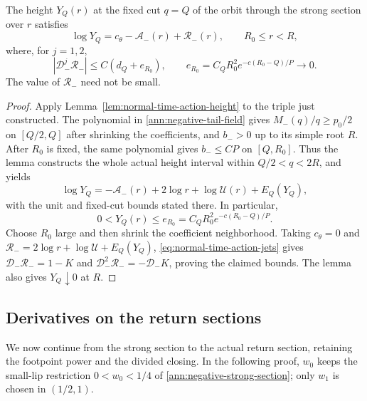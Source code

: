 \begin{lemma}\label{ann:lem-global-action-preparation}
The height \(Y_Q(r)\) at the fixed cut \(q=Q\) of the orbit through
the strong section over \(r\) satisfies
\begin{equation}\label{ann:negative-action-preparation}
 \log Y_Q=c_\theta-\mathcal A_-(r)+\mathcal R_-(r),
 \qquad R_0\le r<R,
\end{equation}
where, for \(j=1,2\),
\begin{equation}\label{ann:negative-action-remainder}
 |\mathcal D_-^j\mathcal R_-|\le C(d_Q+e_{R_0}),\qquad
 e_{R_0}=C_QR_0^2e^{-c(R_0-Q)/P}\longrightarrow0.
\end{equation}
The value of \(\mathcal R_-\) need not be small.
\end{lemma}
\begin{proof}
Apply Lemma~\ref{lem:normal-time-action-height} to the triple just
constructed. The polynomial in \eqref{ann:negative-tail-field}
gives \(M_-(q)/q\ge p_0/2\) on \([Q/2,Q]\) after shrinking the
coefficients, and \(b_->0\) up to its simple root \(R\).
After \(R_0\) is fixed, the same polynomial gives
\(b_-\le CP\) on \([Q,R_0]\). Thus the lemma constructs the
whole actual height interval within \(Q/2<q<2R\), and yields
\begin{equation}\label{ann:global-action-exact}
 \log Y_Q=-\mathcal A_-(r)+2\log r+\log\mathcal U(r)+E_Q(Y_Q),
\end{equation}
with the unit and fixed-cut bounds stated there. In particular,
\begin{equation}\label{ann:negative-small-height}
 0<Y_Q(r)\le e_{R_0}=C_QR_0^2e^{-c(R_0-Q)/P}.
\end{equation}
Choose \(R_0\) large and then shrink the coefficient neighborhood.
Taking \(c_\theta=0\) and
\(\mathcal R_-=2\log r+\log\mathcal U+E_Q(Y_Q)\),
\eqref{eq:normal-time-action-jets} gives
\(\mathcal D_-\mathcal R_-=1-K\) and
\(\mathcal D_-^2\mathcal R_-=-\mathcal D_-K\), proving the
claimed bounds. The lemma also gives \(Y_Q\downarrow0\) at \(R\).
\end{proof}

\subsection{Derivatives on the return sections}

We now continue from the strong section to the actual return section,
retaining the footpoint power and the divided closing. In the following
proof, \(w_0\) keeps the small-lip restriction
\(0<w_0<1/4\) of \eqref{ann:negative-strong-section}; only
\(w_1\) is chosen in \((1/2,1)\).

